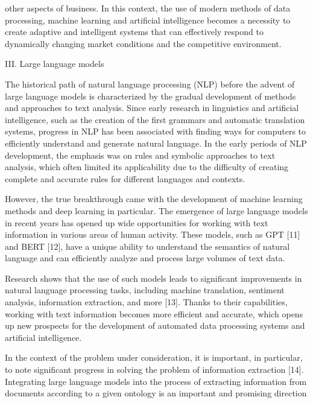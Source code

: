\documentclass [11pt,a4paper]{article}
\begin{document}
\begin{multicols}{2}
other aspects of business. In this context, the use of
modern methods of data processing, machine learning
and artificial intelligence becomes a necessity to create
adaptive and intelligent systems that can effectively respond to dynamically changing market conditions and
the competitive environment.
\setlength{\parskip}{0.2cm}
 \begin{center} III. Large language models \end{center}
 \setlength{\parskip}{0cm}
 \fontsize{11}{12}\selectfont
\par The historical path of natural language processing
(NLP) before the advent of large language models is
characterized by the gradual development of methods
and approaches to text analysis. Since early research in
linguistics and artificial intelligence, such as the creation
of the first grammars and automatic translation systems,
progress in NLP has been associated with finding ways
for computers to efficiently understand and generate natural language. In the early periods of NLP development,
the emphasis was on rules and symbolic approaches to
text analysis, which often limited its applicability due to
the difficulty of creating complete and accurate rules for
different languages and contexts. \par 
However, the true breakthrough came with the development of machine learning methods and deep learning
in particular. The emergence of large language models
in recent years has opened up wide opportunities for
working with text information in various areas of human
activity. These models, such as GPT [11] and BERT
[12], have a unique ability to understand the semantics of
natural language and can efficiently analyze and process
large volumes of text data. \par 
Research shows that the use of such models leads to
significant improvements in natural language processing
tasks, including machine translation, sentiment analysis,
information extraction, and more [13]. Thanks to their capabilities, working with text information becomes more
efficient and accurate, which opens up new prospects for
the development of automated data processing systems
and artificial intelligence.\par 
In the context of the problem under consideration, it
is important, in particular, to note significant progress
in solving the problem of information extraction [14].
Integrating large language models into the process of
extracting information from documents according to a
given ontology is an important and promising direction

\end{multicols}
\end{document}

